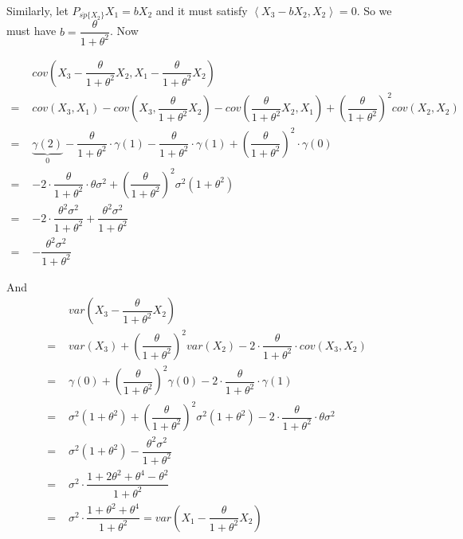 \documentclass[11pt, a4paper]{article}
\numberwithin{equation}{section}
\theoremstyle{definition}
\begin{document}
Similarly, let $P_{\overline{sp}\{X_2\}} X_1 = b X_2$ and it must satisfy $\left\langle X_3 - bX_2, X_2\right\rangle = 0$. So we must have $b = \dfrac{\theta}{1 + \theta^2}$. Now

\begin{align*}
&cov \left(X_3 - \dfrac{\theta}{1 + \theta^2} X_2, X_1 - \dfrac{\theta}{1 + \theta^2} X_2 \right) \\[0.25em]
=\,\, &cov (X_3, X_1) - cov \left(X_3, \dfrac{\theta}{1 + \theta^2} X_2 \right) - cov \left(\dfrac{\theta}{1 + \theta^2} X_2, X_1 \right) + \left(\dfrac{\theta}{1 + \theta^2}\right)^2 cov(X_2, X_2) \\[0.25em]
=\,\, &\underbrace{\gamma(2)}_{0} - \dfrac{\theta}{1 + \theta^2} \cdot \gamma(1) - \dfrac{\theta}{1 + \theta^2} \cdot \gamma(1) + \left( \dfrac{\theta}{1 + \theta^2} \right)^2 \cdot \gamma(0) \\[0.25em]
=\,\, &- 2 \cdot \dfrac{\theta}{1 + \theta^2} \cdot \theta\sigma^2 + \left( \dfrac{\theta}{1 + \theta^2} \right)^2 \sigma^2(1 + \theta^2) \\[0.25em]
=\,\, & - 2 \cdot \dfrac{\theta^2\sigma^2}{1 + \theta^2}  + \dfrac{\theta^2\sigma^2}{1 + \theta^2} \\[0.25em]
=\,\, &-\dfrac{\theta^2\sigma^2}{1 + \theta^2}
\end{align*}

And
\begin{align*}
&var \left(X_3 - \dfrac{\theta}{1 + \theta^2} X_2 \right) \\[0.25em]
=\,\, &var (X_3) + \left(\dfrac{\theta}{1 + \theta^2}\right)^2 var(X_2) - 2 \cdot \dfrac{\theta}{1 + \theta^2} \cdot cov(X_3, X_2) \\[0.25em]
=\,\, &\gamma(0) + \left(\dfrac{\theta}{1 + \theta^2}\right)^2 \gamma(0) - 2 \cdot \dfrac{\theta}{1 + \theta^2} \cdot \gamma(1) \\[0.25em]
=\,\, &\sigma^2(1 + \theta^2) + \left(\dfrac{\theta}{1 + \theta^2}\right)^2 \sigma^2(1 + \theta^2) - 2 \cdot \dfrac{\theta}{1 + \theta^2} \cdot \theta\sigma^2 \\[0.25em]
=\,\, &\sigma^2(1 + \theta^2) - \dfrac{\theta^2\sigma^2}{1 + \theta^2} \\[0.25em]
=\,\, &\sigma^2 \cdot \dfrac{1 + 2\theta^2 + \theta^4 - \theta^2}{1 + \theta^2} \\[0.25em]
=\,\, &\sigma^2 \cdot \dfrac{1 + \theta^2 + \theta^4}{1 + \theta^2} = var \left(X_1 - \dfrac{\theta}{1 + \theta^2} X_2 \right)
\end{align*}
\end{document}
